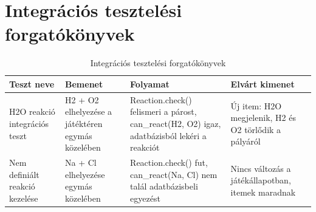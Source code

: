 \documentclass[]{thesis-ekf}
\begin{document}
	\FloatBarrier
	\section{Integrációs tesztelési forgatókönyvek}
	
	\begin{table}[ht!]
		\centering
		\footnotesize
		\begin{tabular}{|p{3cm}|p{4cm}|p{4cm}|p{3cm}|}
			\hline
			\textbf{Teszt neve} & \textbf{Bemenet} & \textbf{Folyamat} & \textbf{Elvárt kimenet} \\
			\hline
			H2O reakció integrációs teszt
			& H2 + O2 elhelyezése a játéktéren egymás közelében
			& Reaction.check() felismeri a párost, can\_react(H2, O2) igaz, adatbázisból lekéri a reakciót
			& Új item: H2O megjelenik, H2 és O2 törlődik a pályáról \\
			
			\hline
			
			Nem definiált reakció kezelése
			& Na + Cl elhelyezése egymás közelében
			& Reaction.check() fut, can\_react(Na, Cl) nem talál adatbázisbeli egyezést
			& Nincs változás a játékállapotban, itemek maradnak \\
			
			\hline
			
		\end{tabular}
		\caption{Integrációs tesztelési forgatókönyvek}
		\label{tab:ITest}
	\end{table}
	
	\FloatBarrier
\end{document}
